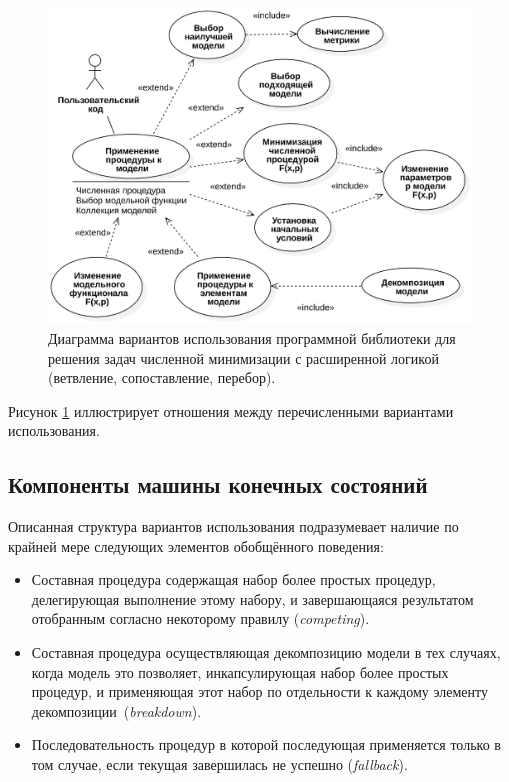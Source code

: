 \begin{figure}
    \centering
    \includegraphics[width=0.95\linewidth]{images/umff-usecase-diagram-02.eps}
    \caption{Диаграмма вариантов использования программной библиотеки для
    решения задач численной минимизации с расширенной логикой (ветвление,
    сопоставление, перебор).}
    \label{fig:umff-usecases}
\end{figure}

Рисунок \ref{fig:umff-usecases} иллюстрирует отношения между перечисленными вариантами
использования.

\subsection{Компоненты машины конечных состояний}

Описанная структура вариантов использования подразумевает наличие по крайней мере
следующих элементов обобщённого поведения:
\begin{itemize}
    \item Составная процедура содержащая набор более простых процедур,
    делегирующая выполнение этому набору, и завершающаяся результатом
    отобранным согласно некоторому правилу (\emph{competing}).
    \item Составная процедура осуществляющая декомпозицию модели в тех случаях,
    когда модель это позволяет, инкапсулирующая набор более простых процедур,
    и применяющая этот набор по отдельности к каждому элементу
    декомпозиции~(\emph{breakdown}).
    \item Последовательность процедур в которой последующая применяется только
    в том случае, если текущая завершилась не успешно
    (\emph{fallback}).
\end{itemize}

